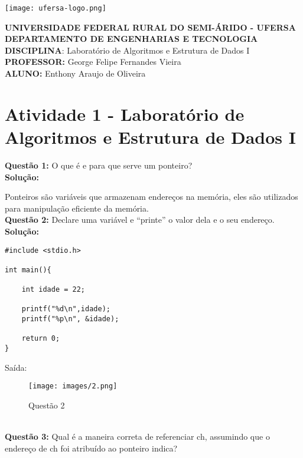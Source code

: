 \documentclass[12pt]{article}
\begin{document}
\begin{center}
    \texttt{[image: ufersa-logo.png]}
\end{center}
\begin{minipage}[c]{\textwidth}
\centering
\large{ {\bfseries UNIVERSIDADE FEDERAL RURAL DO SEMI-ÁRIDO - UFERSA} \\ {\bfseries DEPARTAMENTO DE ENGENHARIAS E TECNOLOGIA} \\ {\bfseries DISCIPLINA}: Laboratório de Algoritmos e Estrutura de Dados I \\ {\bfseries PROFESSOR:} George Felipe Fernandes Vieira\\ {\bfseries ALUNO:} Enthony Araujo de Oliveira }
\end{minipage}

\section*{Atividade 1 - Laboratório de Algoritmos e Estrutura de Dados I}

\textbf{Questão 1:} O que é e para que serve um ponteiro?
\\

\noindent\textbf{Solução:}

Ponteiros são variáveis que armazenam endereços na memória, eles são utilizados para manipulação eficiente da memória. 
\\

\textbf{Questão 2:} Declare uma variável e “printe” o valor dela e o seu endereço.
\\

\noindent\textbf{Solução:}
\begin{lstlisting}[style=c]
#include <stdio.h>

int main(){

    int idade = 22;

    printf("%d\n",idade);
    printf("%p\n", &idade);

    return 0;
}
\end{lstlisting}
Saída: 
\begin{figure}[h]
    \centering
    \texttt{[image: images/2.png]}
    \caption{Questão 2}
    \label{fig:placeholder}
\end{figure}
\\

\textbf{Questão 3:} Qual é a maneira correta de referenciar ch, assumindo que o endereço de ch
foi atribuído ao ponteiro indica?
\\
\end{document}
